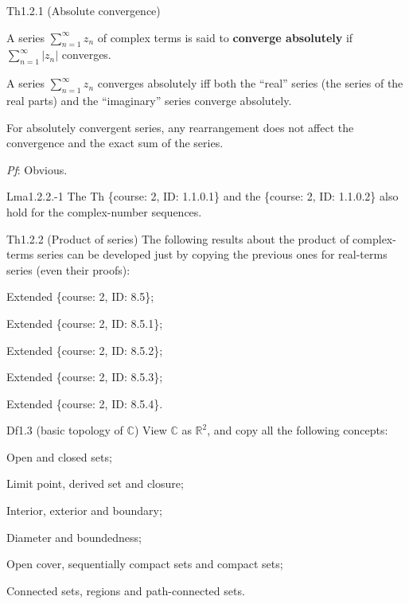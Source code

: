 \documentclass{article}
\begin{document}
\begin{Th}{Th1.2.1 (Absolute convergence)}
    \begin{compactenum}
        \item \textcolor{Df}{A series $\sum_{n=1}^{\infty} z_n$ of complex terms is said to \textbf{converge absolutely} if $\sum_{n=1}^{\infty} |z_n|$ converges.}
        \item A series $\sum_{n=1}^{\infty} z_n$ converges absolutely iff both the ``real'' series (the series of the real parts) and the ``imaginary'' series converge absolutely.
        \item For absolutely convergent series, any rearrangement does not affect the convergence and the exact sum of the series.
    \end{compactenum}
    \tcblower
    \textit{Pf}: Obvious.
\end{Th}

\begin{Th}{Lma1.2.2.-1}
    The Th \{course: 2, ID: 1.1.0.1\} and the \{course: 2, ID: 1.1.0.2\} also hold for the complex-number sequences.
\end{Th}

\begin{Th}{Th1.2.2 (Product of series)}
    The following results about the product of complex-terms series can be developed just by copying the previous ones for real-terms series (even their proofs):
    \begin{compactenum}
        \item \textcolor{Df}{Extended \{course: 2, ID: 8.5\}};
        \item Extended \{course: 2, ID: 8.5.1\};
        \item Extended \{course: 2, ID: 8.5.2\};
        \item Extended \{course: 2, ID: 8.5.3\};
        \item Extended \{course: 2, ID: 8.5.4\}.
    \end{compactenum}
\end{Th}

\begin{Df}{Df1.3 (basic topology of $\mathbb{C}$)}
    View $\mathbb{C}$ as $\mathbb{R}^2$, and copy all the following concepts:
    \begin{compactenum}
        \item Open and closed sets;
        \item Limit point, derived set and closure;
        \item Interior, exterior and boundary;
        \item Diameter and boundedness;
        \item Open cover, sequentially compact sets and compact sets;
        \item Connected sets, regions and path-connected sets.
    \end{compactenum}
\end{Df}
\end{document}
